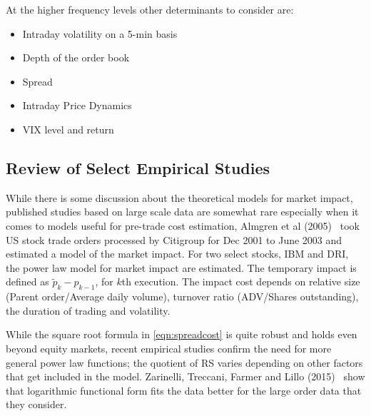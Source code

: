 At the higher frequency levels other determinants to consider are:
	\begin{itemize}
	\item Intraday volatility on a 5-min basis
	\item Depth of the order book
	\item Spread
	\item Intraday Price Dynamics
	\item VIX level and return \twomedskip
	\end{itemize} \label{in:transcost4}



\subsection{Review of Select Empirical Studies}

While there is some discussion about the theoretical models for market impact, published studies based on large scale data are somewhat rare especially when it comes to models useful for pre-trade cost estimation, Almgren et al (2005)~\cite{athl} took US stock trade orders processed by Citigroup for Dec 2001 to June 2003 and estimated a model of the market impact. For two select stocks, IBM and DRI, the power law model for market impact are estimated. The temporary impact is defined as $\widetilde{p}_k - p_{k-1}$, for $k$th execution. The impact cost depends on relative size (Parent order/Average daily volume), turnover ratio (ADV/Shares outstanding), the duration of trading and volatility. 


While the square root formula in \eqref{eqn:spreadcost} is quite robust and holds even beyond equity markets, recent empirical studies confirm the need for more general power law functions; the quotient of RS varies depending on other factors that get included in the model. Zarinelli, Treccani, Farmer and Lillo (2015)~\cite{zar} show that logarithmic functional form fits the data better for the large order data that they consider. 


